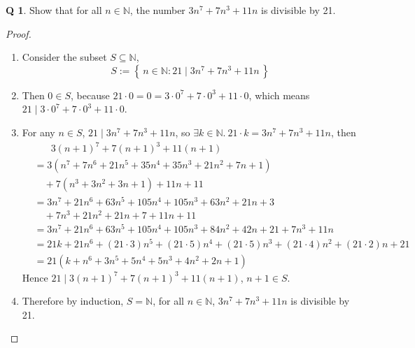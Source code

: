 \documentclass[12pt]{article}
\newcommand{\set}[1]{\left\{\,#1\,\right\}}
\theoremstyle{definition}
\newtheorem{qn}{Q}
\numberwithin{equation}{qn}
\newcommand{\nat}{\mathbb{N}}
\newenvironment{prf}
{
    \begin{proof}
        \hfill
        \begin{enumerate}[label*=\arabic*.]
                }
                {
                \hfill\qedsymbol
        \end{enumerate}
    \renewcommand{\qedsymbol}{}
    \end{proof}
}
\begin{document}
\begin{qn}
    Show that for all $n\in\nat$, the number $3n^7 + 7n^3 + 11n$ is divisible by 21.
\end{qn}
\begin{prf}
\item Consider the subset $S\subseteq\nat$,
    $$S := \set{n\in\nat: 21\mid 3n^7+7n^3+11n}$$
\item Then $0\in S$, because $21\cdot 0 = 0 = 3\cdot0^7 + 7\cdot0^3 + 11\cdot 0$,
    which means $21 \mid 3\cdot0^7 + 7\cdot0^3 + 11\cdot 0$.
\item For any $n\in S$, $21\mid 3n^7+7n^3+11n$, so $\exists k\in\nat.~ 21\cdot k=3n^7+7n^3+11n$, then
    \begin{align*}
        &\phantom{=}\ \,3(n+1)^7 + 7(n+1)^3 + 11(n+1)     \\
        &= 3\left(n^7+7n^6+21n^5+35n^4+35n^3+21n^2+7n+1\right)  \\
        &\quad+7\left(n^3+3n^2+3n+1\right) + 11n + 11       \\
        &= 3n^7+21n^6+63n^5+105n^4+105n^3+63n^2+21n+3  \\
        &\quad+7n^3+21n^2+21n+7 + 11n + 11       \\
        &= 3n^7+21n^6+63n^5+105n^4+105n^3+84n^2+42n+21 + 7n^3 + 11n \\
        &= 21k + 21n^6+(21\cdot3)n^5+(21\cdot5)n^4+(21\cdot5)n^3+(21\cdot4)n^2+(21\cdot2)n+21     \\
        &= 21(k+n^6+3n^5+5n^4+5n^3+4n^2+2n+1)
    \end{align*}
    Hence $21\mid 3(n+1)^7+7(n+1)^3+11(n+1)$, $n+1\in S$.
\item Therefore by induction, $S = \nat$, for all $n\in\nat$, $3n^7 + 7n^3 + 11n$ is divisible by 21.
\end{prf}
\end{document}
